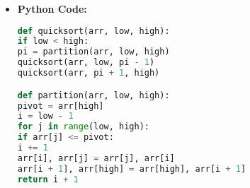 \documentclass[11pt, a4paper]{article}
\begin{document}
	\begin{itemize}
		\item \textbf{Python Code:}
		\begin{lstlisting}[language=Python]
def quicksort(arr, low, high):
if low < high:
pi = partition(arr, low, high)
quicksort(arr, low, pi - 1)
quicksort(arr, pi + 1, high)

def partition(arr, low, high):
pivot = arr[high]
i = low - 1
for j in range(low, high):
if arr[j] <= pivot:
i += 1
arr[i], arr[j] = arr[j], arr[i]
arr[i + 1], arr[high] = arr[high], arr[i + 1]
return i + 1
		\end{lstlisting}
	\end{itemize}
	
\end{document}
